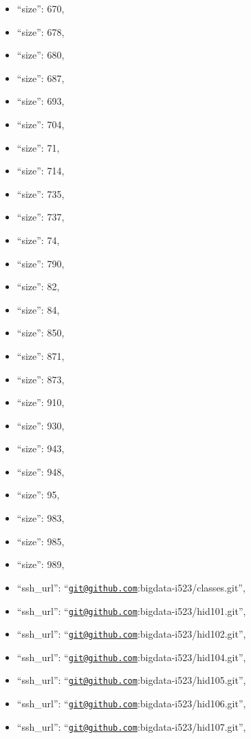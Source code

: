 \begin{itemize}
\item
  ``size'': 670,
\item
  ``size'': 678,
\item
  ``size'': 680,
\item
  ``size'': 687,
\item
  ``size'': 693,
\item
  ``size'': 704,
\item
  ``size'': 71,
\item
  ``size'': 714,
\item
  ``size'': 735,
\item
  ``size'': 737,
\item
  ``size'': 74,
\item
  ``size'': 790,
\item
  ``size'': 82,
\item
  ``size'': 84,
\item
  ``size'': 850,
\item
  ``size'': 871,
\item
  ``size'': 873,
\item
  ``size'': 910,
\item
  ``size'': 930,
\item
  ``size'': 943,
\item
  ``size'': 948,
\item
  ``size'': 95,
\item
  ``size'': 983,
\item
  ``size'': 985,
\item
  ``size'': 989,
\item
  ``ssh\_url'':
  ``\href{mailto:git@github.com}{\nolinkurl{git@github.com}}:bigdata-i523/classes.git'',
\item
  ``ssh\_url'':
  ``\href{mailto:git@github.com}{\nolinkurl{git@github.com}}:bigdata-i523/hid101.git'',
\item
  ``ssh\_url'':
  ``\href{mailto:git@github.com}{\nolinkurl{git@github.com}}:bigdata-i523/hid102.git'',
\item
  ``ssh\_url'':
  ``\href{mailto:git@github.com}{\nolinkurl{git@github.com}}:bigdata-i523/hid104.git'',
\item
  ``ssh\_url'':
  ``\href{mailto:git@github.com}{\nolinkurl{git@github.com}}:bigdata-i523/hid105.git'',
\item
  ``ssh\_url'':
  ``\href{mailto:git@github.com}{\nolinkurl{git@github.com}}:bigdata-i523/hid106.git'',
\item
  ``ssh\_url'':
  ``\href{mailto:git@github.com}{\nolinkurl{git@github.com}}:bigdata-i523/hid107.git'',

\end{itemize}
